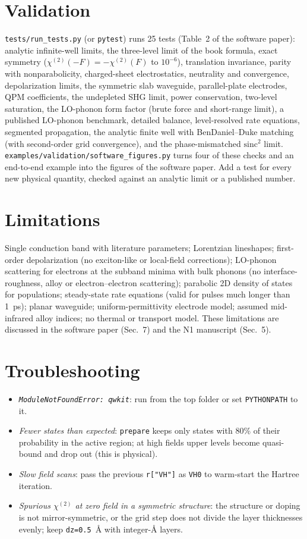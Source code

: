 \documentclass[11pt]{article}
\newcommand{\code}[1]{\texttt{#1}}
\begin{document}
\section{Validation}
\code{tests/run\_tests.py} (or \code{pytest}) runs 25 tests (Table~2 of the software paper): analytic infinite-well limits, the three-level limit of the book formula, exact symmetry ($\chi^{(2)}(-F)=-\chi^{(2)}(F)$ to $10^{-6}$), translation invariance, parity with nonparabolicity, charged-sheet electrostatics, neutrality and convergence, depolarization limits, the symmetric slab waveguide, parallel-plate electrodes, QPM coefficients, the undepleted SHG limit, power conservation, two-level saturation, the LO-phonon form factor (brute force and short-range limit), a published LO-phonon benchmark, detailed balance, level-resolved rate equations, segmented propagation, the analytic finite well with BenDaniel--Duke matching (with second-order grid convergence), and the phase-mismatched $\mathrm{sinc}^2$ limit. \code{examples/validation/software\_figures.py} turns four of these checks and an end-to-end example into the figures of the software paper. Add a test for every new physical quantity, checked against an analytic limit or a published number.

\section{Limitations}
Single conduction band with literature parameters; Lorentzian lineshapes; first-order depolarization (no exciton-like or local-field corrections); LO-phonon scattering for electrons at the subband minima with bulk phonons (no interface-roughness, alloy or electron--electron scattering); parabolic 2D density of states for populations; steady-state rate equations (valid for pulses much longer than 1~ps); planar waveguide; uniform-permittivity electrode model; assumed mid-infrared alloy indices; no thermal or transport model. These limitations are discussed in the software paper (Sec.~7) and the N1 manuscript (Sec.~5).

\section{Troubleshooting}
\begin{itemize}
\item \emph{\code{ModuleNotFoundError: qwkit}}: run from the top folder or set \code{PYTHONPATH} to it.
\item \emph{Fewer states than expected}: \code{prepare} keeps only states with 80\% of their probability in the active region; at high fields upper levels become quasi-bound and drop out (this is physical).
\item \emph{Slow field scans}: pass the previous \code{r["VH"]} as \code{VH0} to warm-start the Hartree iteration.
\item \emph{Spurious $\chi^{(2)}$ at zero field in a symmetric structure}: the structure or doping is not mirror-symmetric, or the grid step does not divide the layer thicknesses evenly; keep \code{dz=0.5}~\AA{} with integer-\AA{} layers.
\end{itemize}
\end{document}
